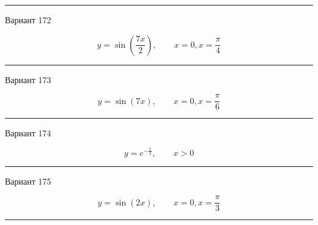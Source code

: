 \documentclass[11pt]{report}
\begin{document}
\rule{\textwidth}{.2mm}

Вариант 172

$$y=\sin{\left(\frac{7 x}{2} \right)}, \qquad x = 0, x = \frac{\pi}{4}$$

\rule{\textwidth}{.2mm}

Вариант 173

$$y=\sin{\left(7 x \right)}, \qquad x = 0, x = \frac{\pi}{6}$$

\rule{\textwidth}{.2mm}

Вариант 174

$$y=e^{- \frac{x}{2}}, \qquad x > 0$$

\rule{\textwidth}{.2mm}

Вариант 175

$$y=\sin{\left(2 x \right)}, \qquad x = 0, x = \frac{\pi}{3}$$

\rule{\textwidth}{.2mm}
\end{document}
